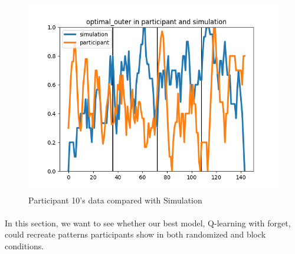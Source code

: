 \begin{figure}[ht]
{\begin{minipage}[t]{0.48\textwidth}
\includegraphics[width=\textwidth]{Figures/10_optimal_outer}
\end{minipage}
}
\decoRule
\caption[Participant 10's data compared with Simulation]{Participant 10's data compared with Simulation}
\label{fig:Participant 10's data compared with Simulation}
\end{figure}

\paragraph{}
In this section, we want to see whether our best model, Q-learning with forget, could recreate patterns participants show in both randomized and block conditions. 
